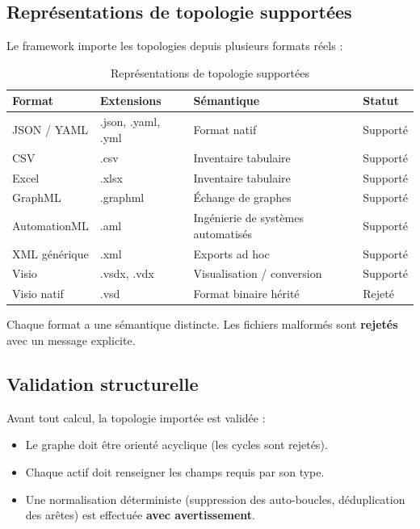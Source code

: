 \documentclass[12pt,a4paper]{article}
\newcommand{\forcereset}[1]{}
\begin{document}
\subsection{Représentations de topologie supportées}
\forcereset{5}

Le framework importe les topologies depuis plusieurs formats réels :

\begin{table}[H]
\centering
\caption{Représentations de topologie supportées}
\label{tab:formats}
\setlength{\tabcolsep}{6pt}
\begin{tabularx}{\textwidth}{p{2.9cm} p{3.4cm} X l}
\toprule
\textbf{Format} & \textbf{Extensions} & \textbf{Sémantique} & \textbf{Statut} \\
\midrule
JSON / YAML & .json, .yaml, .yml & Format natif & Supporté \\
CSV & .csv & Inventaire tabulaire & Supporté \\
Excel & .xlsx & Inventaire tabulaire & Supporté \\
GraphML & .graphml & Échange de graphes & Supporté \\
AutomationML & .aml & Ingénierie de systèmes automatisés & Supporté \\
XML générique & .xml & Exports ad hoc & Supporté \\
Visio & .vsdx, .vdx & Visualisation / conversion & Supporté \\
Visio natif & .vsd & Format binaire hérité & Rejeté \\
\bottomrule
\end{tabularx}
\end{table}

Chaque format a une sémantique distincte. Les fichiers malformés sont \textbf{rejetés} avec un message explicite.

\subsection{Validation structurelle}
\forcereset{5}

Avant tout calcul, la topologie importée est validée :

\begin{itemize}[leftmargin=1.2cm, itemsep=0.2\baselineskip]
    \item Le graphe doit être orienté acyclique (les cycles sont rejetés).
    \item Chaque actif doit renseigner les champs requis par son type.
    \item Une normalisation déterministe (suppression des auto-boucles, déduplication des arêtes) est effectuée \textbf{avec avertissement}.
\end{itemize}
\end{document}
